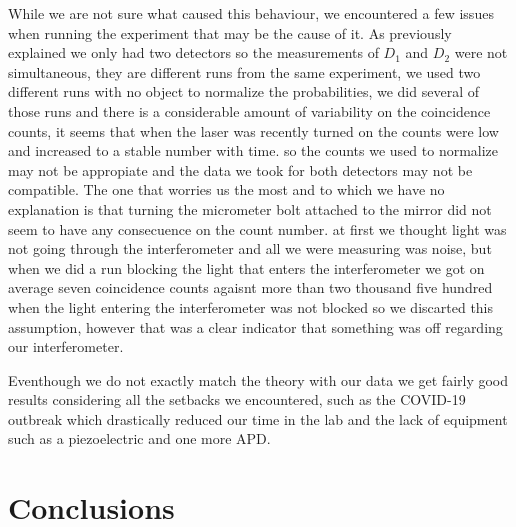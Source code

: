 \documentclass[12pt]{book}
\begin{document}
While we are not sure what caused this behaviour, we encountered a few issues when running the experiment that may be the cause of it. As previously explained  we only had two detectors so the measurements of $D_{1}$ and $D_{2}$ were not simultaneous, they are different runs from the same experiment, we used two different runs with no object to normalize the probabilities, we did several of those runs and there is a considerable amount of variability on the coincidence counts, it seems that when the laser was recently turned on the counts were low and increased to a stable number with time. so the counts we used to normalize may not be appropiate and the data we took for both detectors may not be compatible. The one that worries us the most and to which we have no explanation is that turning the micrometer bolt attached to the mirror did not seem to have any consecuence on the count number. at first we thought light was not going through the interferometer and all we were measuring was noise, but when we did a run blocking the light that enters the interferometer we got on average seven coincidence counts agaisnt  more than two thousand five hundred when the light entering the interferometer was not blocked so we discarted this assumption, however that was a clear indicator that something was off regarding our interferometer.


Eventhough we do not exactly match the theory with our data we get fairly good results considering all the setbacks we encountered, such as the COVID-19 outbreak which drastically reduced our time in the lab and the lack of equipment such as a piezoelectric and one more APD.



\pagebreak

 
\chapter{Conclusions}
\thispagestyle{plain}

\pagebreak
{}




\end{document}
